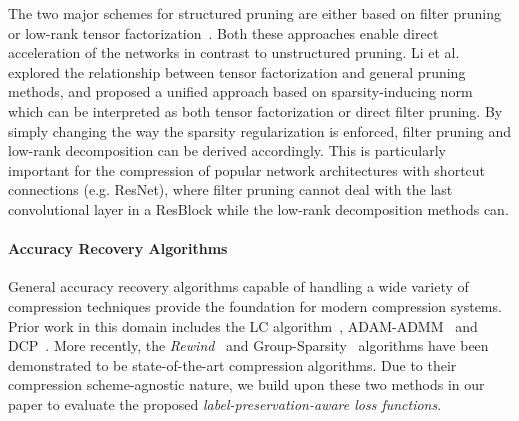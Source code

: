 The two major schemes for structured pruning are either based on filter pruning~\cite{joseph2019condensa} or low-rank tensor factorization~\cite{li2020group}. Both these approaches enable direct acceleration of the networks in contrast to unstructured pruning.
Li et al.~\cite{li2020group} explored the relationship between tensor factorization and general pruning methods, and proposed a unified approach based on sparsity-inducing norm which can be interpreted as both tensor factorization or direct filter pruning. By simply changing the way the sparsity regularization is enforced, filter pruning and low-rank decomposition can be derived accordingly. 
This is particularly important for the compression of popular network architectures with shortcut connections (e.g. ResNet), where filter pruning cannot deal with the last convolutional layer in a ResBlock while the low-rank decomposition methods can.

\paragraph{Accuracy Recovery Algorithms} General accuracy recovery algorithms capable of handling a wide variety of compression techniques provide the foundation for modern compression systems. Prior work in this domain includes the LC algorithm~\cite{carreira2017model}, ADAM-ADMM~\cite{zhang2018adam} and DCP~\cite{zhuang2018discrimination}. More recently,
the \textit{Rewind}~\cite{renda2020rewind} and Group-Sparsity~\cite{li2020group} algorithms have been demonstrated to be state-of-the-art compression algorithms.
Due to their compression scheme-agnostic nature, we build upon these two methods in our paper to evaluate the proposed \emph{label-preservation-aware loss functions}.
%

